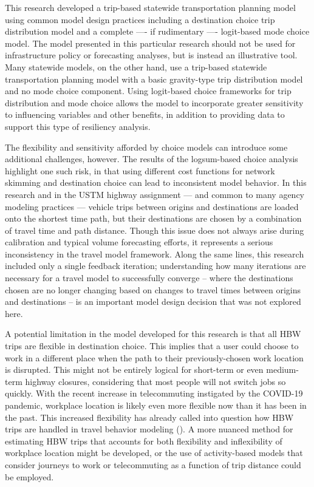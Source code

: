 \documentclass[]{ascelike-new}
\begin{document}
This research developed a trip-based statewide transportation planning
model using common model design practices including a destination choice
trip distribution model and a complete ---- if rudimentary ----
logit-based mode choice model. The model presented in this particular
research should not be used for infrastructure policy or forecasting
analyses, but is instead an illustrative tool. Many statewide models, on
the other hand, use a trip-based statewide transportation planning model
with a basic gravity-type trip distribution model and no mode choice
component. Using logit-based choice frameworks for trip distribution and
mode choice allows the model to incorporate greater sensitivity to
influencing variables and other benefits, in addition to providing data
to support this type of resiliency analysis.

The flexibility and sensitivity afforded by choice models can introduce
some additional challenges, however. The results of the logsum-based
choice analysis highlight one such risk, in that using different cost
functions for network skimming and destination choice can lead to
inconsistent model behavior. In this research and in the USTM highway
assignment --- and common to many agency modeling practices --- vehicle
trips between origins and destinations are loaded onto the shortest time
path, but their destinations are chosen by a combination of travel time
and path distance. Though this issue does not always arise during
calibration and typical volume forecasting efforts, it represents a
serious inconsistency in the travel model framework. Along the same
lines, this research included only a single feedback iteration;
understanding how many iterations are necessary for a travel model to
successfully converge -- where the destinations chosen are no longer
changing based on changes to travel times between origins and
destinations -- is an important model design decision that was not
explored here.

A potential limitation in the model developed for this research is that
all HBW trips are flexible in destination choice. This implies that a
user could choose to work in a different place when the path to their
previously-chosen work location is disrupted. This might not be entirely
logical for short-term or even medium-term highway closures, considering
that most people will not switch jobs so quickly. With the recent
increase in telecommuting instigated by the COVID-19 pandemic, workplace
location is likely even more flexible now than it has been in the past.
This increased flexibility has already called into question how HBW
trips are handled in travel behavior modeling
(). A more nuanced method for
estimating HBW trips that accounts for both flexibility and
inflexibility of workplace location might be developed, or the use of
activity-based models that consider journeys to work or telecommuting as
a function of trip distance could be employed.
\end{document}
